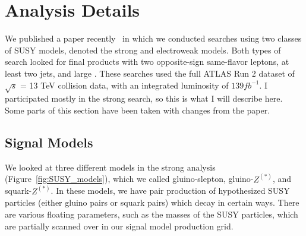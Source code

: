 \chapter{Analysis Details}

We published a paper recently~\cite{SUSY_2l2j} in which we conducted searches using two classes of SUSY models, denoted the strong and electroweak models. Both types of search looked for final products with two opposite-sign same-flavor leptons, at least two jets, and large \MET. These searches used the full ATLAS Run 2 dataset of $\sqrt{s}$ = 13 TeV collision data, with an integrated luminosity of $139 fb^{-1}$. I participated mostly in the strong search, so this is what I will describe here. Some parts of this section have been taken with changes from the paper.

\section{Signal Models}

We looked at three different models in the strong analysis (Figure~\ref{fig:SUSY_models}), which we called gluino-slepton, gluino-$Z^{(*)}$, and squark-$Z^{(*)}$. In these models, we have pair production of hypothesized SUSY particles (either gluino pairs or squark pairs) which decay in certain ways. There are various floating parameters, such as the masses of the SUSY particles, which are partially scanned over in our signal model production grid.

